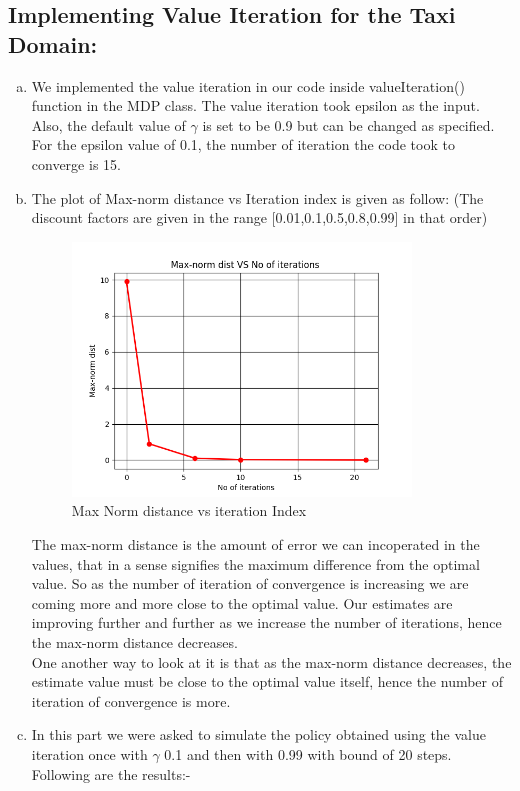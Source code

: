\documentclass{article}
\begin{document}
\subsection{Implementing Value Iteration for the Taxi Domain:}
\begin{enumerate}[a)]
    \item We implemented the value iteration in our code inside valueIteration() function in the MDP class. The value iteration took epsilon as the input. Also, the default value of $\gamma$ is set to be 0.9 but can be changed as specified. For the epsilon value of 0.1, the number of iteration the code took to converge is 15.
    \item The plot of Max-norm distance vs Iteration index is given as follow: (The discount factors are given in the range [0.01,0.1,0.5,0.8,0.99] in that order)
    \begin{center}
        \begin{figure}[H]
\hfill\includegraphics[width=9cm]{QA2b.png}\hspace*{\fill}
        \caption{Max Norm distance vs iteration Index}
        \label{fig:Max Norm distance vs iteration Index}
\end{figure}
\end{center}
    The max-norm distance is the amount of error we can incoperated in the values, that in a sense signifies the maximum difference from the optimal value. So as the number of iteration of convergence is increasing we are coming more and more close to the optimal value. Our estimates are improving further and further as we increase the number of iterations, hence the max-norm distance decreases. \\
    One another way to look at it is that as the max-norm distance decreases, the estimate value must be close to the optimal value itself, hence the number of iteration of convergence is more. 
    \item In this part we were asked to simulate the policy obtained using the value iteration once with $\gamma$ 0.1 and then with 0.99 with bound of 20 steps. Following are the results:- 
    

\end{enumerate}
\end{document}
